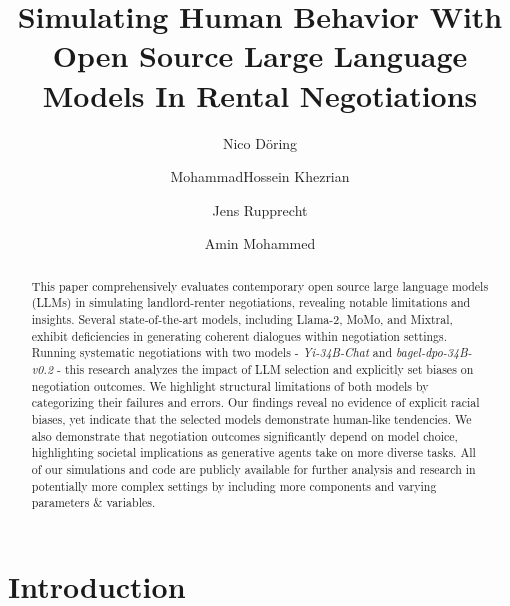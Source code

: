 \documentclass[runningheads]{llncs}
\begin{document}
%
\title{Simulating Human Behavior With Open Source Large Language Models In Rental Negotiations}
%
%
\author{Nico Döring \and
MohammadHossein Khezrian \and
Jens Rupprecht \and
Amin Mohammed}
%
%
%
\maketitle              %
%
\begin{abstract}
This paper comprehensively evaluates contemporary open source large language models (LLMs) in simulating landlord-renter negotiations, revealing notable limitations and insights. Several state-of-the-art models, including Llama-2, MoMo, and Mixtral, exhibit deficiencies in generating coherent dialogues within negotiation settings. Running systematic negotiations with two models - \textit{Yi-34B-Chat} and \textit{bagel-dpo-34B-v0.2} - this research analyzes the impact of LLM selection and explicitly set biases on negotiation outcomes. We highlight structural limitations of both models by categorizing their failures and errors. Our findings reveal no evidence of explicit racial biases, yet indicate that the selected models demonstrate human-like tendencies. We also demonstrate that negotiation outcomes significantly depend on model choice, highlighting societal implications as generative agents take on more diverse tasks. All of our simulations and code are publicly available for further analysis and research in potentially more complex settings by including more components and varying parameters \& variables.
\end{abstract}
%
%
%
\section{Introduction}
\end{document}
